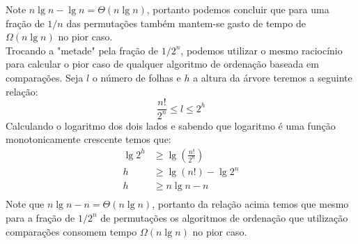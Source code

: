 Note $n\lg n - \lg n = \Theta(n \lg n)$, portanto podemos concluir que para uma 
fração de $1/n$ das permutações também mantem-se gasto de tempo de $\Omega(n 
\lg 
n)$ no pior caso.
\\[6pt]
Trocando a "metade" pela fração de $1/2^n$, podemos utilizar o mesmo raciocínio 
para calcular o pior caso de qualquer algoritmo de ordenação baseada em 
comparações. Seja $l$ o número de folhas e $h$ a altura da árvore teremos a 
seguinte relação:
\[ \frac{n!}{2^n} \leq l \leq 2^h \]
Calculando o logaritmo dos dois lados e sabendo que logaritmo é uma função 
monotonicamente crescente temos que:
\begin{align*}
     \lg 2^h  &\geq  \lg (\frac{n!}{2^n}) \\
     h & \geq \lg (n!) - \lg 2^n \\
     h & \geq n \lg n - n \\
\end{align*}
Note que $n \lg n - n = \Theta(n \lg n)$, portanto da relação acima temos que 
mesmo para a fração de $1/2^n$ de permutações os algoritmos de ordenação que 
utilização comparações consomem tempo $\Omega(n \lg n)$ no pior caso.
\pagebreak